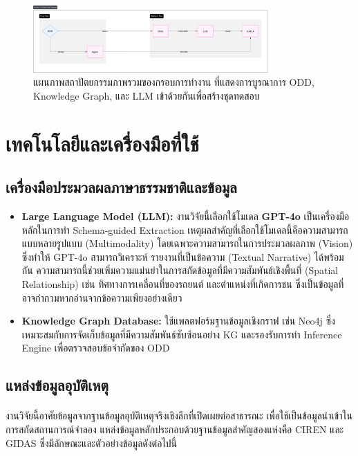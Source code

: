 \begin{figure}[htbp]
    \centering
    \includegraphics[width=0.8\textwidth]{images/system-architecture-overview}
    \caption{แผนภาพสถาปัตยกรรมภาพรวมของกรอบการทำงาน ที่แสดงการบูรณาการ ODD, Knowledge Graph, และ LLM เข้าด้วยกันเพื่อสร้างชุดทดสอบ}
    \label{fig:system_architecture_overview}
\end{figure}

\section{เทคโนโลยีและเครื่องมือที่ใช้}

\subsection{เครื่องมือประมวลผลภาษาธรรมชาติและข้อมูล}
\begin{itemize}
    \item \textbf{Large Language Model (LLM):} งานวิจัยนี้เลือกใช้โมเดล \textbf{GPT-4o} \cite{openai2024gpt4o} เป็นเครื่องมือหลักในการทำ Schema-guided Extraction เหตุผลสำคัญที่เลือกใช้โมเดลนี้คือความสามารถแบบหลายรูปแบบ (Multimodality) โดยเฉพาะความสามารถในการประมวลผลภาพ (Vision) ซึ่งทำให้ GPT-4o สามารถวิเคราะห์ รายงานที่เป็นข้อความ (Textual Narrative) ได้พร้อมกัน ความสามารถนี้ช่วยเพิ่มความแม่นยำในการสกัดข้อมูลที่มีความสัมพันธ์เชิงพื้นที่ (Spatial Relationship) เช่น ทิศทางการเคลื่อนที่ของรถยนต์ และตำแหน่งที่เกิดการชน ซึ่งเป็นข้อมูลที่อาจกำกวมหากอ่านจากข้อความเพียงอย่างเดียว

    \item \textbf{Knowledge Graph Database:} ใช้แพลตฟอร์มฐานข้อมูลเชิงกราฟ เช่น Neo4j \cite{neo4j} ซึ่งเหมาะสมกับการจัดเก็บข้อมูลที่มีความสัมพันธ์ซับซ้อนอย่าง KG และรองรับการทำ Inference Engine เพื่อตรวจสอบข้อจำกัดของ ODD
\end{itemize}

\subsection{แหล่งข้อมูลอุบัติเหตุ}\label{subsec:accident-data-sources}
\paragraph{}
งานวิจัยนี้อาศัยข้อมูลจากฐานข้อมูลอุบัติเหตุจริงเชิงลึกที่เปิดเผยต่อสาธารณะ เพื่อใช้เป็นข้อมูลนำเข้าในการสกัดสถานการณ์จำลอง แหล่งข้อมูลหลักประกอบด้วยฐานข้อมูลสำคัญสองแห่งคือ CIREN และ GIDAS ซึ่งมีลักษณะและตัวอย่างข้อมูลดังต่อไปนี้


